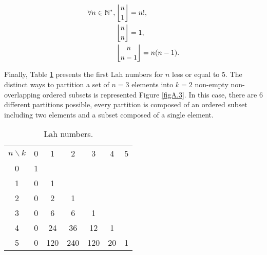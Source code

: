 \begin{subequations} \label{eqnA.13}
\begin{align}
\forall n \in \mathbb{N}^{*} ,\, & \genfrac{\lfloor}{\rfloor}{0pt}{0}{n}{1} = n!, \label{eqnA.13a} \\
& \genfrac{\lfloor}{\rfloor}{0pt}{0}{n}{n} = 1, \label{eqnA.13b} \\
& \genfrac{\lfloor}{\rfloor}{0pt}{0}{n}{n-1} = n(n-1). \label{eqnA.13c}
\end{align}
\end{subequations}

Finally, Table \ref{tabA.3} presents the first Lah numbers for $n$ less or equal to $5$. The distinct ways to partition a set of $n=3$ elements into $k=2$ non-empty non-overlapping ordered subsets is represented Figure \ref{figA.3}. In this case, there are $6$ different partitions possible, every partition is composed of an ordered subset including two elements and a subset composed of a single element.

\begin{table}[!htbp]
\centering
\caption{Lah numbers.}
\label{tabA.3}
\begin{tabular}{ccccccc}
\toprule
$n \backslash k$ & 0 & 1 & 2 & 3 & 4 & 5 \\
\cmidrule(lr){1-7}
0 & 1 & & & & & \\
1 & 0 & 1 & & & & \\
2 & 0 & 2 & 1 & & & \\
3 & 0 & 6 & 6 & 1 & & \\
4 & 0 & 24 & 36 & 12 & 1 & \\
5 & 0 & 120 & 240 & 120 & 20 & 1 \\
\bottomrule
\end{tabular}
\end{table}

